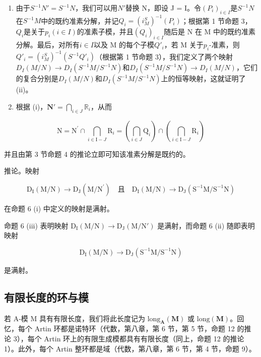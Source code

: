 \begin{enumerate}
\item
   由于\(S^{-1}N' = S^{-1}N\)，我们可以用\(N'\)替换 N，即设 J = I。令\((P_i)_{i \in I}\)是\(S^{-1}N\)在\(S^{-1}M\)中的既约准素分解，并记\(Q_i = (i_M^S)^{-1}(P_i)\)；根据第 1 节命题 3，\(Q_i\)是关于\(p_i (i \in I)\)的准素子模，并且\((Q_i)_{i \in I}\)随后是 N 在 M 中的既约准素分解。最后，对所有\(i \in I\)以及 M 的每个子模\(Q'_i\)，若 M 关于\(p_i\)-准素，则\(Q'_i = (i_M^S)^{-1}(S^{-1}Q'_i)\)（根据第 1 节命题 3），我们定义了两个映射\(D_I(M/N) \to D_I(S^{-1}M/S^{-1}N)\)和\(D_I(S^{-1}M/S^{-1}N) \to D_I(M/N)\)，它们的复合分别是\(D_I(M/N)\)和\(D_I(S^{-1}M/S^{-1}N)\)上的恒等映射，这就证明了 (ii)。
\item
  根据 (i)，\(\mathbf{N}' = \bigcap_{i\in J}\mathbb{R}_i\)，从而
\end{enumerate}

\[
\mathrm{N} = \mathrm{N} ^ {\prime} \cap \bigcap_ {i \in \mathrm{I} - J} \mathrm{R} _ {i} = \left(\bigcap_ {i \in J} \mathrm{Q} _ {i}\right) \cap \left(\bigcap_ {i \in \mathrm{I} - J} \mathrm{R} _ {i}\right)
\]

并且由第 3 节命题 4 的推论立即可知该准素分解是既约的。

推论。映射

\[
\mathrm{D} _ {\mathrm{I}} (\mathrm{M} / \mathrm{N}) \rightarrow \mathrm{D} _ {\mathrm{J}} (\mathrm{M} / \mathrm{N} ^ {\prime}) \quad \text{且} \quad \mathrm{D} _ {\mathrm{I}} (\mathrm{M} / \mathrm{N}) \rightarrow \mathrm{D} _ {\mathrm{J}} (\mathrm{S} ^ {- 1} \mathrm{M} / \mathrm{S} ^ {- 1} \mathrm{N})
\]

在命题 6 (i) 中定义的映射是满射。

命题 6 (iii) 表明映射 \(\mathrm{D}_{\mathrm{I}}(\mathrm{M}/\mathrm{N}) \rightarrow \mathrm{D}_{\mathrm{J}}(\mathrm{M}/\mathrm{N}')\) 是满射，而命题 6 (ii) 随即表明映射

\[
\mathrm{D} _ {\mathrm{I}} (\mathrm{M} / \mathrm{N}) \rightarrow \mathrm{D} _ {\mathrm{J}} (\mathrm{S} ^ {- 1} \mathrm{M} / \mathrm{S} ^ {- 1} \mathrm{N})
\]

是满射。

\subsection{有限长度的环与模}

若 A-模 M 具有有限长度，我们将此长度记为 \(\text{long}_{\mathbf{A}}(\mathbf{M})\) 或 \(\text{long}(\mathbf{M})\)。回忆，每个 Artin 环都是诺特环（代数，第八章，第 6 节，第 5 节，命题 12 的推论 3），每个 Artin 环上的有限生成模都具有有限长度（同上，命题 12 的推论 1）。此外，每个 Artin 整环都是域（代数，第八章，第 6 节，第 4 节，命题 9）。

